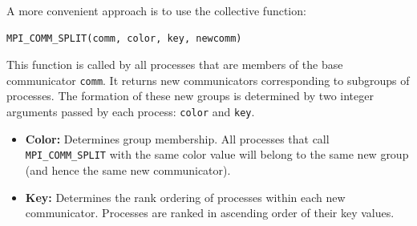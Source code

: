 \documentclass[12pt]{book}
\begin{document}
A more convenient approach is to use the collective function:
\begin{lstlisting}[style=cppstyle, caption={MPI communicator split function}]
MPI_COMM_SPLIT(comm, color, key, newcomm)
\end{lstlisting}

This function is called by all processes that are members of the base communicator \texttt{comm}.  
It returns new communicators corresponding to subgroups of processes. The formation of these new groups is determined by two integer arguments passed by each process: \texttt{color} and \texttt{key}.  

\begin{itemize}
    \item \textbf{Color:} Determines group membership. All processes that call \texttt{MPI\_COMM\_SPLIT} with the same color value will belong to the same new group (and hence the same new communicator).
    \item \textbf{Key:} Determines the rank ordering of processes within each new communicator. Processes are ranked in ascending order of their key values.
\end{itemize}
\end{document}
